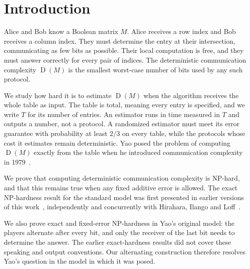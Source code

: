 \documentclass[11pt,letterpaper]{article} \usepackage[utf8]{inputenc}
\theoremstyle{plain} \newtheorem{theorem}{Theorem}[section]
\theoremstyle{definition} \newaliascnt{definition}{theorem}
\newcommand{\D}{\operatorname{D}}
\begin{document}
\section{Introduction}
\label{sec:intro}

Alice and Bob know a Boolean matrix $M$. Alice receives a row index and
Bob receives a column index. They must determine the entry at their
intersection, communicating as few bits as possible. Their local
computation is free, and they must answer correctly for every pair of
indices. The deterministic communication complexity $\D(M)$ is the
smallest worst-case number of bits used by any such protocol.

We study how hard it is to estimate $\D(M)$ when the algorithm receives
the whole table as input. The table is total, meaning every entry is specified, and we write $T$ for its number
of entries. An estimator runs in time measured in $T$ and outputs a number,
not a protocol. A randomized estimator must meet its error guarantee with
probability at least $2/3$ on every table, while the protocols whose cost it
estimates remain deterministic. Yao posed the problem of computing $\D(M)$
exactly from the table when he introduced communication complexity in
1979~\cite{yao1979distributed}.

We prove that computing deterministic communication complexity is
NP-hard, and that this remains true when any fixed additive error is
allowed. The exact NP-hardness result for the standard model was first
presented in earlier versions of this
work~\cite{gaspers-he-mackenzie-npcc}, independently and concurrently
with Hirahara, Ilango and Loff~\cite{hirahara2025communication}.

We also prove exact and fixed-error NP-hardness in Yao's original
model: the players alternate after every bit, and only the receiver
of the last bit needs to determine the answer. The earlier
exact-hardness results did not cover these speaking and output
conventions. Our alternating construction therefore resolves Yao's
question in the model in which it was posed.
\end{document}
